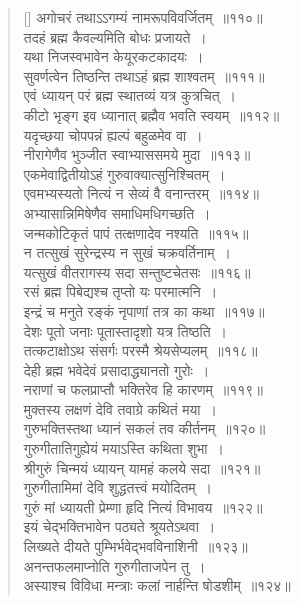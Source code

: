 \documentclass[twoside,12pt,notitlepage]{book}
\begin{document}
\begin{verse}[\versewidth]
	अगोचरं तथाऽऽगम्यं नामरूपविवर्जितम्~॥११०॥\\
	तदहं ब्रह्म कैवल्यमिति बोधः प्रजायते~।\\[-6pt]
यथा निजस्वभावेन केयूरकटकादयः~।\\[-6pt]
सुवर्णत्वेन तिष्ठन्ति तथाऽहं ब्रह्म शाश्वतम्~॥१११॥\\
एवं ध्यायन् परं ब्रह्म स्थातव्यं यत्र कुत्रचित्~।\\[-6pt]
कीटो भृङ्ग इव ध्यानात् ब्रह्मैव भवति स्वयम्~॥११२॥\\
यदृच्छया चोपपन्नं ह्यल्पं बहुळमेव वा~।\\[-6pt]
नीरागेणैव भुञ्जीत स्वाभ्याससमये मुदा~॥११३॥\\
एकमेवाद्वितीयोऽहं गुरुवाक्यात्सुनिश्चितम्~।\\[-6pt]
एवमभ्यस्यतो नित्यं न सेव्यं वै वनान्तरम्~॥११४॥\\
अभ्यासान्निमिषेणैव समाधिमधिगच्छति~।\\[-6pt]
जन्मकोटिकृतं पापं तत्क्षणादेव नश्यति~॥११५॥\\
न तत्सुखं सुरेन्द्रस्य न सुखं चक्रवर्तिनाम्~।\\[-6pt]
यत्सुखं वीतरागस्य सदा सन्तुष्टचेतसः~॥११६॥\\
रसं ब्रह्म पिबेद्यश्च तृप्तो यः परमात्मनि~।\\[-6pt]
इन्द्रं च मनुते रङ्कं नृपाणां तत्र का कथा~॥११७॥\\
देशः पूतो जनाः पूतास्तादृशो यत्र तिष्ठति~।\\[-6pt]
तत्कटाक्षोऽथ संसर्गः परस्मै श्रेयसेप्यलम्~॥११८॥\\
देही ब्रह्म भवेदेवं प्रसादाद्ध्यानतो गुरोः~।\\[-6pt]
नराणां च फलप्राप्तौ भक्तिरेव हि कारणम्~॥११९॥\\
मुक्तस्य लक्षणं देवि तवाग्रे कथितं मया~।\\[-6pt]
गुरुभक्तिस्तथा ध्यानं सकलं तव कीर्तनम्~॥१२०॥\\
गुरुगीतातिगुह्येयं मयाऽस्ति कथिता शुभा~।\\[-6pt]
श्रीगुरुं चिन्मयं ध्यायन् यामहं कलये सदा~॥१२१॥\\
गुरुगीतामिमां देवि शुद्धतत्त्वं मयोदितम्~।\\[-6pt]
गुरुं मां ध्यायती प्रेम्णा हृदि नित्यं विभावय~॥१२२॥\\
इयं चेद्भक्तिभावेन पठ्यते श्रूयतेऽथवा~।\\[-6pt]
लिख्यते दीयते पुम्भिर्भवेद्भवविनाशिनी~॥१२३॥\\
अनन्तफलमाप्नोति गुरुगीताजपेन तु~।\\[-6pt]
अस्याश्च विविधा मन्त्राः कलां नार्हन्ति षोडशीम्~॥१२४॥\\

\end{verse}
\end{document}
